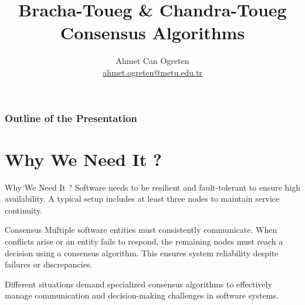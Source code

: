\documentclass[11pt]{beamer}              %
\author[Ahmet Can Ogreten]{Ahmet Can Ogreten\\\href{mailto:ahmet.ogreten@metu.edu.tr}{ahmet.ogreten@metu.edu.tr}}
\title[WINS Beamer Template]{Bracha-Toueg \& Chandra-Toueg Consensus Algorithms}
\begin{document}
\begin{frame}[plain]
\titlepage
{}
\end{frame}

\begin{frame}[label=toc]
    \frametitle{Outline of the Presentation}
    \tableofcontents[subsubsectionstyle=hide]
\end{frame}
%
%
\section{Why We Need It ?}

\begin{frame}{Why We Need It ?}
Software needs to be resilient and fault-tolerant to ensure high availability. A typical setup includes at least three nodes to maintain service continuity.
\begin{block}{Consensus}
Multiple software entities must consistently communicate. When conflicts arise or an entity fails to respond, the remaining nodes must reach a decision using a consensus algorithm. This ensures system reliability despite failures or discrepancies.
\end{block}
Different situations demand specialized consensus algorithms to effectively manage communication and decision-making challenges in software systems.
\note{}
\end{frame}
\end{document}
